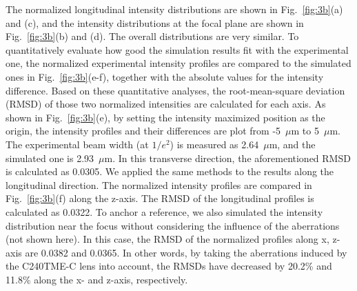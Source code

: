 \documentclass[9pt,twocolumn,twoside]{osajnl}
\begin{document}
The normalized longitudinal intensity distributions are shown in Fig.~\ref{fig:3b}(a) and (c), and the intensity distributions at the focal plane are shown in Fig.~\ref{fig:3b}(b) and (d). The overall distributions are very similar. To quantitatively evaluate how good the simulation results fit with the experimental one, the normalized experimental intensity profiles are compared to the simulated ones in Fig.~\ref{fig:3b}(e-f), together with the absolute values for the intensity difference. Based on these quantitative analyses, the root-mean-square deviation (RMSD) of those two normalized intensities are calculated for each axis. As shown in Fig.~\ref{fig:3b}(e), by setting the intensity maximized position as the origin, the intensity profiles and their differences are plot from  -5~$\mu$m to 5~$\mu$m. The experimental beam width (at $1/e^2$) is measured as 2.64~$\mu$m, and the simulated one is 2.93~$\mu$m. In this transverse direction, the aforementioned RMSD is calculated as 0.0305. We applied the same methods to the results along the longitudinal direction. The normalized intensity profiles are compared in Fig.~\ref{fig:3b}(f) along the z-axis. The RMSD of the longitudinal profiles is calculated as 0.0322. To anchor a reference, we also simulated the intensity distribution near the focus without considering the influence of the aberrations (not shown here). In this case, the RMSD of the normalized profiles along x, z-axis are 0.0382 and 0.0365. In other words, by taking the aberrations induced by the C240TME-C lens into account, the RMSDs have decreased by 20.2\% and 11.8\% along the x- and z-axis, respectively.
\end{document}
